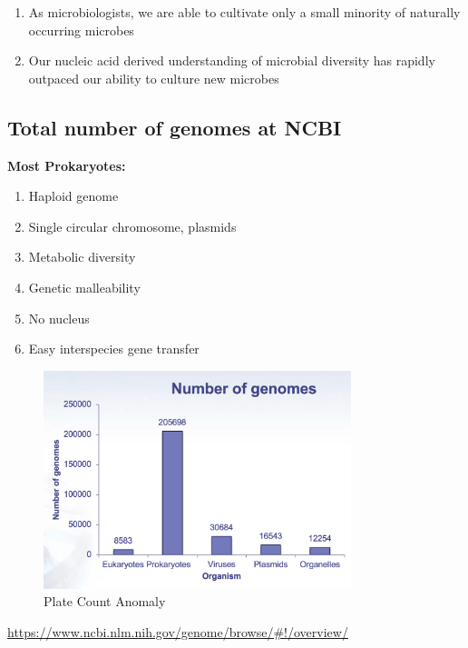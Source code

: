 \documentclass[
]{book}
\providecommand{\tightlist}{%
  \setlength{\itemsep}{0pt}\setlength{\parskip}{0pt}}
\begin{document}
\begin{enumerate}
\def\labelenumi{\arabic{enumi}.}
\setcounter{enumi}{1}
\item
  As microbiologists, we are able to cultivate only a small minority of naturally occurring microbes
\item
  Our nucleic acid derived understanding of microbial diversity has rapidly outpaced our ability to culture new microbes
\end{enumerate}

\hypertarget{total-number-of-genomes-at-ncbi}{%
\subsection{Total number of genomes at NCBI}\label{total-number-of-genomes-at-ncbi}}

\textbf{Most Prokaryotes:}

\begin{enumerate}
\def\labelenumi{\arabic{enumi}.}
\tightlist
\item
  Haploid genome
\item
  Single circular chromosome, plasmids
\item
  Metabolic diversity
\item
  Genetic malleability
\item
  No nucleus
\item
  Easy interspecies gene transfer
\end{enumerate}

\begin{figure}
\centering
\includegraphics[width=0.8\textwidth,height=\textheight]{./Figures/Genomes1.png}
\caption{Plate Count Anomaly}
\end{figure}

\url{https://www.ncbi.nlm.nih.gov/genome/browse/\#!/overview/}
\end{document}
